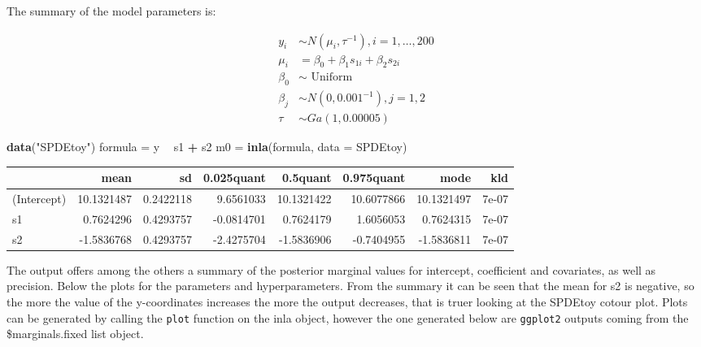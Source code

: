 \documentclass[
  12pt,
  a4paper,
  oneside]{book}
\newenvironment{Shaded}{\begin{snugshade}}{\end{snugshade}}
\newcommand{\DataTypeTok}[1]{\textcolor[rgb]{0.13,0.29,0.53}{#1}}
\newcommand{\KeywordTok}[1]{\textcolor[rgb]{0.13,0.29,0.53}{\textbf{#1}}}
\newcommand{\NormalTok}[1]{#1}
\newcommand{\OperatorTok}[1]{\textcolor[rgb]{0.81,0.36,0.00}{\textbf{#1}}}
\newcommand{\StringTok}[1]{\textcolor[rgb]{0.31,0.60,0.02}{#1}}
\theoremstyle{definition}
\theoremstyle{definition}
\theoremstyle{definition}
\theoremstyle{remark}
\begin{document}
The summary of the model parameters is:

\[
\begin{aligned}
y_{i} & \sim N\left(\mu_{i}, \tau^{-1}\right), i=1, \ldots, 200 \\
\mu_{i} &=\beta_{0}+\beta_{1} s_{1 i}+\beta_{2} s_{2 i} \\
\beta_{0} & \sim \text { Uniform } \\
\beta_{j} & \sim N\left(0,0.001^{-1}\right), j=1,2 \\
\tau & \sim G a(1,0.00005)
\end{aligned}
\]

\begin{Shaded}
\begin{Highlighting}[]
\KeywordTok{data}\NormalTok{(}\StringTok{"SPDEtoy"}\NormalTok{)}
\NormalTok{formula =}\StringTok{ }\NormalTok{y }\OperatorTok{~}\StringTok{ }\NormalTok{s1 }\OperatorTok{+}\StringTok{ }\NormalTok{s2}
\NormalTok{m0 =}\StringTok{ }\KeywordTok{inla}\NormalTok{(formula, }\DataTypeTok{data =}\NormalTok{ SPDEtoy)}
\end{Highlighting}
\end{Shaded}

\begin{tabular}{lrrrrrrr}
\toprule
  & mean & sd & 0.025quant & 0.5quant & 0.975quant & mode & kld\\
\midrule
(Intercept) & 10.1321487 & 0.2422118 & 9.6561033 & 10.1321422 & 10.6077866 & 10.1321497 & 7e-07\\
s1 & 0.7624296 & 0.4293757 & -0.0814701 & 0.7624179 & 1.6056053 & 0.7624315 & 7e-07\\
s2 & -1.5836768 & 0.4293757 & -2.4275704 & -1.5836906 & -0.7404955 & -1.5836811 & 7e-07\\
\bottomrule
\end{tabular}

The output offers among the others a summary of the posterior marginal values for intercept, coefficient and covariates, as well as precision. Below the plots for the parameters and hyperparameters. From the summary it can be seen that the mean for s2 is negative, so the more the value of the y-coordinates increases the more the output decreases, that is truer looking at the SPDEtoy cotour plot. Plots can be generated by calling the \texttt{plot} function on the inla object, however the one generated below are \texttt{ggplot2} outputs coming from the \$marginals.fixed list object.
\end{document}
